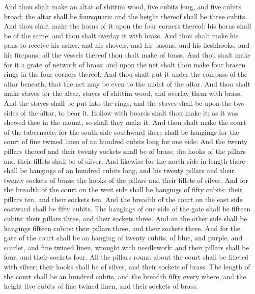 \begin{biblechapter} %
 And thou shalt make an altar of shittim wood, five cubits long, and five cubits broad; the altar shall be foursquare: and the height thereof shall be three cubits.
\verse And thou shalt make the horns of it upon the four corners thereof: his horns shall be of the same: and thou shalt overlay it with brass.
\verse And thou shalt make his pans to receive his ashes, and his shovels, and his basons, and his fleshhooks, and his firepans: all the vessels thereof thou shalt make of brass.
\verse And thou shalt make for it a grate of network of brass; and upon the net shalt thou make four brasen rings in the four corners thereof.
\verse And thou shalt put it under the compass of the altar beneath, that the net may be even to the midst of the altar.
\verse And thou shalt make staves for the altar, staves of shittim wood, and overlay them with brass.
\verse And the staves shall be put into the rings, and the staves shall be upon the two sides of the altar, to bear it.
\verse Hollow with boards shalt thou make it: as it was shewed thee in the mount, so shall they make it.
 And thou shalt make the court of the tabernacle: for the south side southward there shall be hangings for the court of fine twined linen of an hundred cubits long for one side:
\verse And the twenty pillars thereof and their twenty sockets shall be of brass; the hooks of the pillars and their fillets shall be of silver.
\verse And likewise for the north side in length there shall be hangings of an hundred cubits long, and his twenty pillars and their twenty sockets of brass; the hooks of the pillars and their fillets of silver.
\verse And for the breadth of the court on the west side shall be hangings of fifty cubits: their pillars ten, and their sockets ten.
\verse And the breadth of the court on the east side eastward shall be fifty cubits.
\verse The hangings of one side of the gate shall be fifteen cubits: their pillars three, and their sockets three.
\verse And on the other side shall be hangings fifteen cubits: their pillars three, and their sockets three.
\verse And for the gate of the court shall be an hanging of twenty cubits, of blue, and purple, and scarlet, and fine twined linen, wrought with needlework: and their pillars shall be four, and their sockets four.
\verse All the pillars round about the court shall be filleted with silver; their hooks shall be of silver, and their sockets of brass.
\verse The length of the court shall be an hundred cubits, and the breadth fifty every where, and the height five cubits of fine twined linen, and their sockets of brass.

\end{biblechapter}
